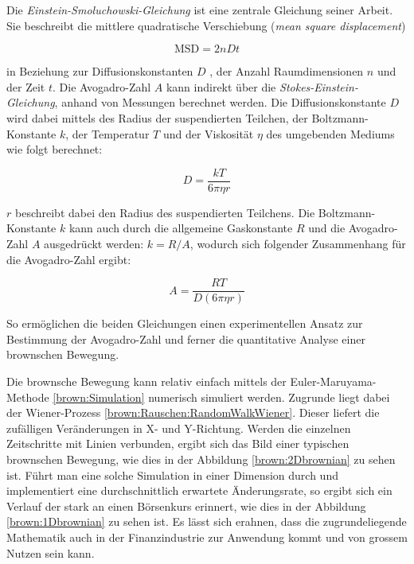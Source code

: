 Die \textit{Einstein-Smoluchowski-Gleichung} ist eine zentrale Gleichung seiner Arbeit. Sie beschreibt die mittlere quadratische Verschiebung (\textit{mean square displacement})

\begin{equation}
	\mathrm{MSD} = 2nDt
\end{equation}

in Beziehung zur Diffusionskonstanten $ D $ , der Anzahl Raumdimensionen $ n $ und der Zeit $ t $. Die Avogadro-Zahl $ A $ kann indirekt über die \textit{Stokes-Einstein-Gleichung}, anhand von Messungen berechnet werden. Die Diffusionskonstante $ D $ wird dabei mittels des Radius der suspendierten Teilchen, der Boltzmann-Konstante  $ k $, der Temperatur $ T $ und der Viskosität $ \eta $ des umgebenden Mediums wie folgt berechnet:

\begin{equation}
	D = \frac{kT}{6\pi\eta r}
\end{equation}

$ r $ beschreibt dabei den Radius des suspendierten Teilchens. Die Boltzmann-Konstante $ k $ kann auch durch die allgemeine Gaskonstante $ R $ und die Avogadro-Zahl $ A $ ausgedrückt werden: $ k = R/A $, wodurch sich folgender Zusammenhang für die Avogadro-Zahl ergibt:

\begin{equation}
	A = \frac{R T}{D (6 \pi \eta r)}
\end{equation}

So ermöglichen die beiden Gleichungen einen experimentellen Ansatz zur Bestimmung der Avogadro-Zahl und ferner die quantitative Analyse einer brownschen Bewegung.

Die brownsche Bewegung kann relativ einfach mittels der Euler-Maruyama-Methode \ref{brown:Simulation} numerisch simuliert werden. Zugrunde liegt dabei der Wiener-Prozess \ref{brown:Rauschen:RandomWalkWiener}. Dieser liefert die zufälligen Veränderungen in X- und Y-Richtung. Werden die einzelnen Zeitschritte mit Linien verbunden, ergibt sich das Bild einer typischen brownschen Bewegung, wie dies in der Abbildung \ref{brown:2Dbrownian} zu sehen ist. Führt man eine solche Simulation in einer Dimension durch und implementiert eine durchschnittlich erwartete Änderungsrate, so ergibt sich ein Verlauf der stark an einen Börsenkurs erinnert, wie dies in der Abbildung \ref{brown:1Dbrownian} zu sehen ist. Es lässt sich erahnen, dass die zugrundeliegende Mathematik auch in der Finanzindustrie zur Anwendung kommt und von grossem Nutzen sein kann.


